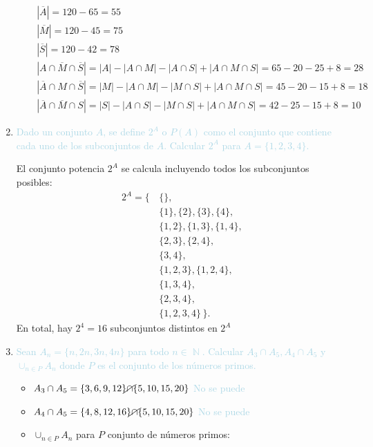 \documentclass{article}
\newcommand{\lb}[1]{\textcolor{lightblue}{#1}}
\DeclareMathOperator{\N}{\mathbb{N}}
\begin{document}
\begin{enumerate}[label=\color{red}\textbf{\arabic*)},leftmargin=*]
\begin{enumerate}[label=\color{red}\alph*)]
      	$\begin{array}{l}
      		\left|\overline{A}\right|=120-65=55\\
      		|\overline{M}|=120-45=75\\
      		|\overline{S}|=120-42=78\\
      		\left|A\cap \overline{M}\cap \overline{S}\right|=|A|-|A\cap M|-|A\cap S|+|A\cap M\cap S|=65-20-25+8=28\\
      		\left|\overline{A}\cap M\cap \overline{S}\right|=|M|-|A\cap M|-|M\cap S|+|A\cap M\cap S|=45-20-15+8=18\\
      		\left|\overline{A}\cap \overline{M}\cap S\right|=|S|-|A\cap S|-|M\cap S|+\left|A\cap M\cap S\right|=42-25-15+8=10
      	\end{array}$
      \end{enumerate}
      
      \item \lb{Dado un conjunto $A$, se define $2^A$ o $P(A)$ como el conjunto que contiene cada uno de los subconjuntos de $A$. Calcular $2^{A}$ para $A=\{1,2,3,4\}$.}
      
      El conjunto potencia $2^{A}$ se calcula incluyendo todos los subconjuntos posibles:
      \begin{align*}
      	2^A = \{\, &\{\}, \\
      	&\{1\}, \{2\}, \{3\}, \{4\}, \\
      	&\{1, 2\}, \{1, 3\}, \{1, 4\}, \\
      	&\{2, 3\}, \{2, 4\}, \\
      	&\{3, 4\}, \\
      	&\{1, 2, 3\}, \{1, 2, 4\}, \\
      	&\{1, 3, 4\}, \\
      	&\{2, 3, 4\}, \\
      	&\{1, 2, 3, 4\} \,\}.
      \end{align*}
      En total, hay $2^4=16$ subconjuntos distintos en $2^{A}$
      \item \lb{Sean $A_n=\{n,2n,3n,4n\}$ para todo $n\in\N$. Calcular $A_3\cap A_5,A_4\cap A_5$ y $\cup_{n\in P}A_n$ donde $P$ es el conjunto de los números primos.}
      \begin{itemize}[label=$-$]
      	\item $A_3\cap A_5=\{3,6,9,12\}\cancel{\cap}\{5,10,15,20\}$ \lb{No se puede}
      	\item $A_4\cap A_5=\{4,8,12,16\}\cancel{\cap}\{5,10,15,20\}$ \lb{No se puede}
      	\item $\cup_{n\in P}A_n$ para $P$ conjunto de números primos:
      	

\end{itemize}
\end{enumerate}
\end{document}

